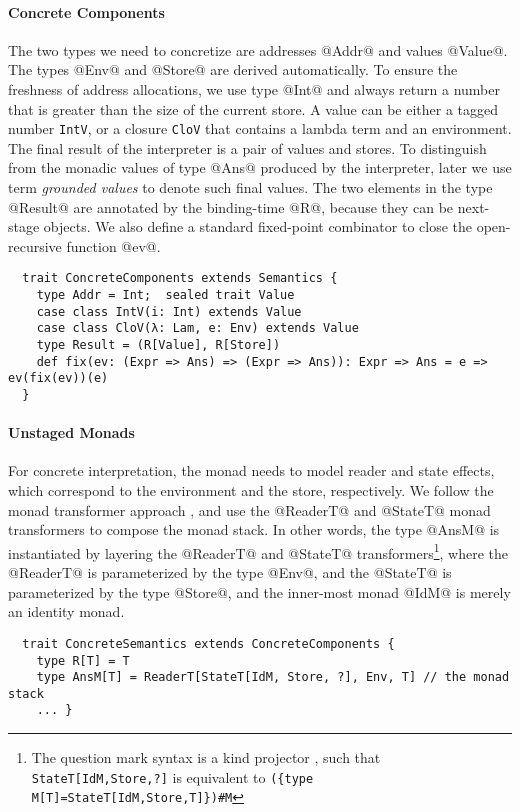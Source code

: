 \paragraph{Concrete Components}
The two types we need to concretize are addresses @Addr@ and values @Value@. The
types @Env@ and @Store@ are derived automatically. To ensure the freshness of
address allocations, we use type @Int@ and always return a number that is greater
than the size of the current store.
A value can be either a tagged number \texttt{IntV}, or a closure
\texttt{CloV} that contains a lambda term and an environment. The final
result of the interpreter is a pair of values and stores.
To distinguish from the monadic values of type @Ans@ produced by the
interpreter, later we use term \textit{grounded values} to denote such final values.
The two elements in the type @Result@ are annotated by the binding-time @R@,
because they can be next-stage objects.  We also define a standard fixed-point
combinator to close the open-recursive function @ev@.
\begin{lstlisting}
  trait ConcreteComponents extends Semantics {
    type Addr = Int;  sealed trait Value
    case class IntV(i: Int) extends Value
    case class CloV(λ: Lam, e: Env) extends Value
    type Result = (R[Value], R[Store])
    def fix(ev: (Expr => Ans) => (Expr => Ans)): Expr => Ans = e => ev(fix(ev))(e)
  }
\end{lstlisting}

\paragraph{Unstaged Monads}
For concrete interpretation, the monad needs to model reader and state effects,
which correspond to the environment and the store, respectively. We follow the
monad transformer approach \cite{DBLP:conf/popl/LiangHJ95},
and use the @ReaderT@ and @StateT@ monad transformers to
compose the monad stack. In other words, the type @AnsM@ is
instantiated by layering the @ReaderT@ and @StateT@ transformers\footnote{The
question mark syntax is a kind projector \cite{kindprojector}, such that
\texttt{StateT[IdM,Store,?]} is equivalent to \newline \texttt{(\{type
M[T]=StateT[IdM,Store,T]\})\#M}}, where the @ReaderT@ is parameterized by the
type @Env@, and the @StateT@ is parameterized by the type @Store@, and the
inner-most monad @IdM@ is merely an identity monad.
\begin{lstlisting}
  trait ConcreteSemantics extends ConcreteComponents {
    type R[T] = T
    type AnsM[T] = ReaderT[StateT[IdM, Store, ?], Env, T] // the monad stack
    ... }
\end{lstlisting}

